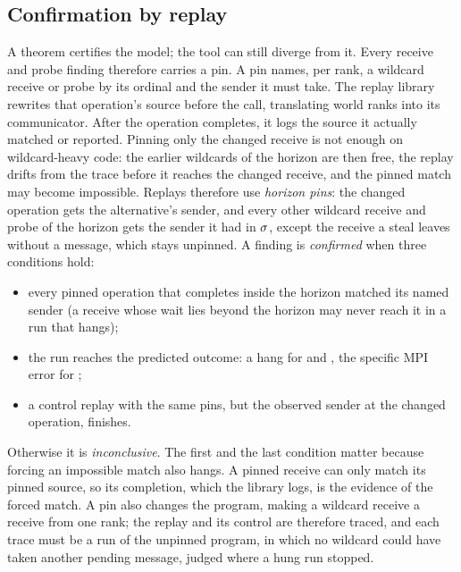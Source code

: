 \subsection{Confirmation by replay}
\label{sec:replay}

A theorem certifies the model; the tool can still diverge from it. Every receive and
probe finding therefore carries a pin. A pin names, per rank, a wildcard receive or probe by
its ordinal and the sender it must take. The replay library rewrites that operation's source
before the call, translating world ranks into its communicator. After the operation
completes, it logs the source it actually matched or reported. Pinning only the changed
receive is not enough on wildcard-heavy code: the earlier wildcards of the horizon are then
free, the replay drifts from the trace before it reaches the changed receive, and the pinned
match may become impossible. Replays therefore use \emph{horizon pins}: the changed operation
gets the alternative's sender, and every other wildcard receive and probe of the horizon gets
the sender it had in $\sigma$, except the receive a steal leaves without a message, which
stays unpinned. A finding is \emph{confirmed} when three conditions hold:
\begin{itemize}[leftmargin=*]
\item every pinned operation that completes inside the horizon matched its named sender (a
  receive whose wait lies beyond the horizon may never reach it in a run that hangs);
\item the run reaches the predicted outcome: a hang for  and , the
  specific MPI error for ;
\item a control replay with the same pins, but the observed sender at the changed
  operation, finishes.
\end{itemize}
Otherwise it is \emph{inconclusive}. The first and the last condition matter because
forcing an impossible match also hangs. A pinned receive can only match its pinned source,
so its completion, which the library logs, is the evidence of the forced match. A pin also
changes the program, making a wildcard receive a receive from one rank; the replay and its
control are therefore traced, and each trace must be a run of the unpinned program, in which no
wildcard could have taken another pending message, judged where a hung run stopped.
